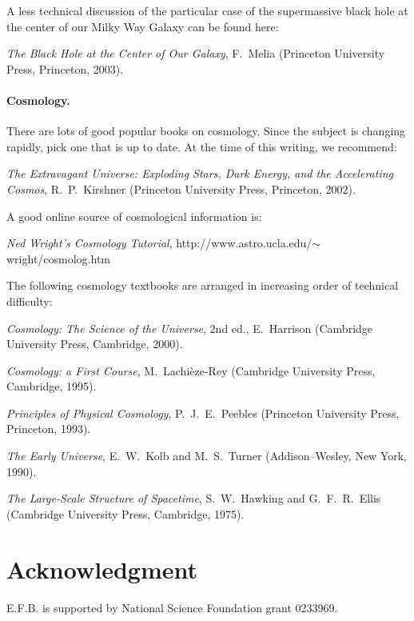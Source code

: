 \medskip
\noindent
A less technical discussion of the particular case of the supermassive
black hole at the center of our Milky Way Galaxy can be found here:

\medskip
\noindent
{\it The Black Hole at the Center of Our Galaxy}, F.\ Melia (Princeton
University Press, Princeton, 2003).

\paragraph{Cosmology.}  There are lots of good popular books on cosmology.
Since the subject is changing rapidly, pick one that is up to date.
At the time of this writing, we recommend:

\medskip
\noindent
{\it The Extravagant Universe: Exploding Stars, Dark Energy, and the 
Accelerating Cosmos}, R.\ P.\ Kirshner (Princeton University Press, 
Princeton, 2002).

\medskip
\noindent
A good online source of cosmological information is:


\medskip\noindent
{\it Ned Wright's Cosmology Tutorial}, 
\hfill \break http://www.astro.ucla.edu/$\sim$wright/cosmolog.htm

\medskip

\noindent
The following cosmology textbooks are arranged in increasing order
of technical difficulty:

\medskip
\noindent
{\it Cosmology: The Science of the Universe}, 2nd ed., E.\ Harrison
(Cambridge University Press, Cambridge, 2000).

\medskip
\noindent
{\it Cosmology: a First Course}, M.\ Lachi\`eze-Rey (Cambridge
University Press, Cambridge, 1995).

\medskip
\noindent
{\it Principles of Physical Cosmology}, P.\ J.\ E.\ Peebles (Princeton
University Press, Princeton, 1993).

\medskip
\noindent
{\it The Early Universe}, E.\ W.\ Kolb and M.\ S.\ Turner (Addison--Wesley,
New York, 1990).

\medskip
\noindent
{\it The Large-Scale Structure of Spacetime}, 
S.\ W.\ Hawking and G.\ F.\ R.\ Ellis (Cambridge University Press, 
Cambridge, 1975).


\section*{Acknowledgment}

E.F.B. is supported by National Science Foundation grant 0233969.









